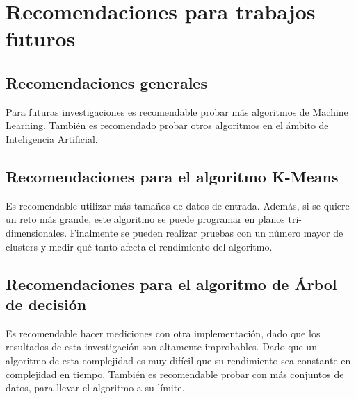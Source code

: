 \documentclass{article}
\begin{document}
\section{Recomendaciones para trabajos futuros}
\subsection{Recomendaciones generales}
Para futuras investigaciones es recomendable probar más algoritmos de Machine Learning. También es recomendado probar otros algoritmos en el ámbito de Inteligencia Artificial.

\subsection{Recomendaciones para el algoritmo K-Means}
Es recomendable utilizar más tamaños de datos de entrada. Además, si se quiere un reto más grande, este algoritmo se puede programar en planos tri-dimensionales. Finalmente se pueden realizar pruebas con un número mayor de clusters y medir qué tanto afecta el rendimiento del algoritmo.

\subsection{Recomendaciones para el algoritmo de Árbol de decisión}
Es recomendable hacer mediciones con otra implementación, dado que los resultados de esta investigación son altamente improbables. Dado que un algoritmo de esta complejidad es muy difícil que su rendimiento sea constante en complejidad en tiempo. También es recomendable probar con más conjuntos de datos, para llevar el algoritmo a su límite.
\newpage

\printbibliography{}
\end{document}
